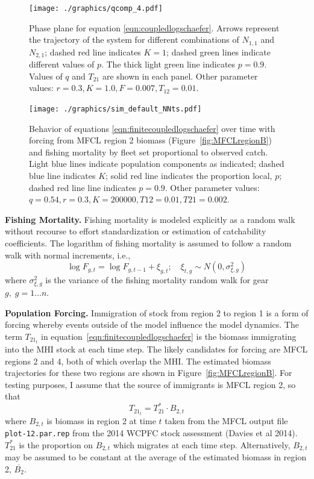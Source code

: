 \documentclass[12pt,letterpaper,twoside]{article}
\newcommand\widebar[1]{\overline{#1}}
\newcommand\None{{N_{1,1}}}
\newcommand\Ntwo{{N_{2,1}}}
\begin{document}
\begin{figure}
\begin{center}
\texttt{[image: ./graphics/qcomp\_4.pdf]}
\caption{\label{fig:NNphase}
Phase plane for equation \ref{eqn:coupledlogschaefer}. Arrows represent
the trajectory of the system for different combinations of $\None$ and
$\Ntwo$; dashed red  line indicates $K = 1$; dashed green lines indicate
different values of $p$. The thick light green line indicates $p=0.9$.
Values of $q$ and $T_{21}$ are shown in each panel.
Other parameter values: $r=0.3, K=1.0, F = 0.007, T_{12}=0.01$.
}
\end{center}
\end{figure}

\begin{figure}
\begin{center}
\texttt{[image: ./graphics/sim\_default\_NNts.pdf]}
\caption{\label{fig:NNts}
Behavior of equations \ref{eqn:finitecoupledlogschaefer} over time with
forcing from MFCL region 2 biomass (Figure~\ref{fig:MFCLregionB}) and
fishing mortality by fleet set proportional to observed catch.
Light blue lines indicate population components as indicated; 
dashed blue line indicates $K$;
solid red line indicates the proportion local, $p$;  
dashed red line line indicates $p=0.9$.
Other parameter values: $q=0.54, r=0.3, K=200000, T12=0.01, T21=0.002$.
}
\end{center}
\end{figure}

{\bf Fishing Mortality.}
Fishing mortality is
modeled explicitly as a random walk
without recourse to effort standardization or
estimation of catchability coefficients. The logarithm of fishing
mortality is assumed to
follow a random walk with normal increments, i.e.,
\begin{equation}
\log F_{g,t} = \log F_{g,t-1} + \xi_{g,t};\quad \xi_{t,g}\sim
N(0,\sigma^2_{\xi,g}) \label{eqn:Fwalk}
\end{equation}
where  $\sigma^2_{\xi,g}$ is the variance of the fishing
mortality random walk for gear $g,\; g=1\ldots n$.

{\bf Population Forcing.}
Immigration of stock from region 2 to region 1 is a
form of forcing whereby events outside of the model influence the
model dynamics. The term $T_{{21}_t}$ in 
equation~\ref{eqn:finitecoupledlogschaefer}
is the biomass immigrating
into the MHI stock at each time step. 
The likely candidates for forcing are MFCL regions 2 and 4, both of
which overlap the MHI. The estimated biomass trajectories for these
two regions are shown in Figure~\ref{fig:MFCLregionB}.
For testing purposes,
I assume that the source of immigrants is MFCL region 2, so that
\begin{equation}
T_{{21}_t} = T^*_{21}\cdot B_{2,t}
\end{equation}
where $B_{2,t}$ is biomass in region 2 at time $t$ taken from the MFCL output file
{\tt plot-12.par.rep} from the 2014 WCPFC stock assessment
(Davies et al 2014). $T^*_{21}$ is the proportion on
$B_{2,t}$ which migrates at each time step.
Alternatively, $B_{2,t}$ may be assumed to be constant at the average
of the estimated biomass in region 2, $\widebar{B_{2}}$.
\end{document}
